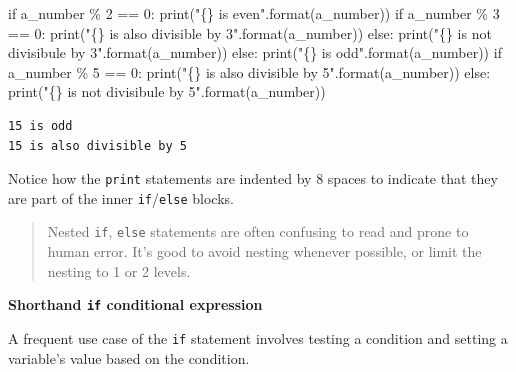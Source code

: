\documentclass[
  letterpaper,
  DIV=11,
  numbers=noendperiod]{scrreprt}
\newenvironment{Shaded}{\begin{snugshade}}{\end{snugshade}}
\newcommand{\BuiltInTok}[1]{\textcolor[rgb]{0.00,0.23,0.31}{#1}}
\newcommand{\ControlFlowTok}[1]{\textcolor[rgb]{0.00,0.23,0.31}{#1}}
\newcommand{\DecValTok}[1]{\textcolor[rgb]{0.68,0.00,0.00}{#1}}
\newcommand{\NormalTok}[1]{\textcolor[rgb]{0.00,0.23,0.31}{#1}}
\newcommand{\OperatorTok}[1]{\textcolor[rgb]{0.37,0.37,0.37}{#1}}
\newcommand{\SpecialCharTok}[1]{\textcolor[rgb]{0.37,0.37,0.37}{#1}}
\newcommand{\StringTok}[1]{\textcolor[rgb]{0.13,0.47,0.30}{#1}}
\begin{document}
\begin{Shaded}
\begin{Highlighting}[]
\ControlFlowTok{if}\NormalTok{ a\_number }\OperatorTok{\%} \DecValTok{2} \OperatorTok{==} \DecValTok{0}\NormalTok{:}
    \BuiltInTok{print}\NormalTok{(}\StringTok{"}\SpecialCharTok{\{\}}\StringTok{ is even"}\NormalTok{.}\BuiltInTok{format}\NormalTok{(a\_number))}
    \ControlFlowTok{if}\NormalTok{ a\_number }\OperatorTok{\%} \DecValTok{3} \OperatorTok{==} \DecValTok{0}\NormalTok{:}
        \BuiltInTok{print}\NormalTok{(}\StringTok{"}\SpecialCharTok{\{\}}\StringTok{ is also divisible by 3"}\NormalTok{.}\BuiltInTok{format}\NormalTok{(a\_number))}
    \ControlFlowTok{else}\NormalTok{:}
        \BuiltInTok{print}\NormalTok{(}\StringTok{"}\SpecialCharTok{\{\}}\StringTok{ is not divisibule by 3"}\NormalTok{.}\BuiltInTok{format}\NormalTok{(a\_number))}
\ControlFlowTok{else}\NormalTok{:}
    \BuiltInTok{print}\NormalTok{(}\StringTok{"}\SpecialCharTok{\{\}}\StringTok{ is odd"}\NormalTok{.}\BuiltInTok{format}\NormalTok{(a\_number))}
    \ControlFlowTok{if}\NormalTok{ a\_number }\OperatorTok{\%} \DecValTok{5} \OperatorTok{==} \DecValTok{0}\NormalTok{:}
        \BuiltInTok{print}\NormalTok{(}\StringTok{"}\SpecialCharTok{\{\}}\StringTok{ is also divisible by 5"}\NormalTok{.}\BuiltInTok{format}\NormalTok{(a\_number))}
    \ControlFlowTok{else}\NormalTok{:}
        \BuiltInTok{print}\NormalTok{(}\StringTok{"}\SpecialCharTok{\{\}}\StringTok{ is not divisibule by 5"}\NormalTok{.}\BuiltInTok{format}\NormalTok{(a\_number))}
\end{Highlighting}
\end{Shaded}

\begin{verbatim}
15 is odd
15 is also divisible by 5
\end{verbatim}

Notice how the \texttt{print} statements are indented by 8 spaces to
indicate that they are part of the inner \texttt{if}/\texttt{else}
blocks.

\begin{quote}
Nested \texttt{if}, \texttt{else} statements are often confusing to read
and prone to human error. It's good to avoid nesting whenever possible,
or limit the nesting to 1 or 2 levels.
\end{quote}

\textbf{Shorthand \texttt{if} conditional expression}

A frequent use case of the \texttt{if} statement involves testing a
condition and setting a variable's value based on the condition.
\end{document}
